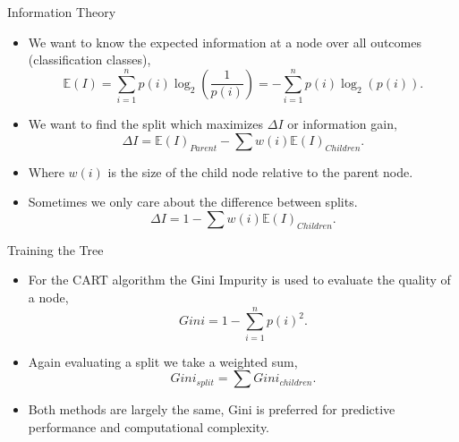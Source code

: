 \documentclass[xcolor={svgnames},
               hyperref={colorlinks,citecolor=DeepPink4,linkcolor=FireBrick,urlcolor=Maroon}]
               {beamer}
\begin{document}
  \begin{frame}{Information Theory}
    \begin{itemize}
      \item We want to know the expected information at a node over all outcomes (classification classes), 
      \begin{equation*}
        \mathbb{E}(I) = \sum_{i = 1}^n p(i) \log_2\left(\frac{1}{p(i)}\right) = -\sum_{i = 1}^n p(i)\log_2(p(i)).
      \end{equation*}
      \vfill
      \item We want to find the split which maximizes $\Delta I$ or information gain, 
      \begin{equation*}
        \Delta I = \mathbb{E}(I)_{Parent} - \sum w(i) \mathbb{E}(I)_{Children}.  
      \end{equation*}
      \item Where $w(i)$ is the size of the child node relative to the parent node. 
      \vfill
      \item Sometimes we only care about the difference between splits. 
      \begin{equation*}
        \Delta I = 1 - \sum w(i) \mathbb{E}(I)_{Children}.  
      \end{equation*}
    \end{itemize}
  \end{frame}


  \begin{frame}{Training the Tree}
    \begin{itemize}
    \item For the CART algorithm the Gini Impurity is used to evaluate the quality of a node, 
    \begin{equation*}
      Gini = 1 - \sum_{i = 1}^n p(i)^2.
    \end{equation*}
    \item Again evaluating a split we take a weighted sum, 
    \begin{equation*}
      Gini_{split} = \sum Gini_{children}.
    \end{equation*}
    \item Both methods are largely the same, Gini is preferred for predictive performance and computational complexity. 
  \end{itemize}
  \end{frame}
\end{document}
